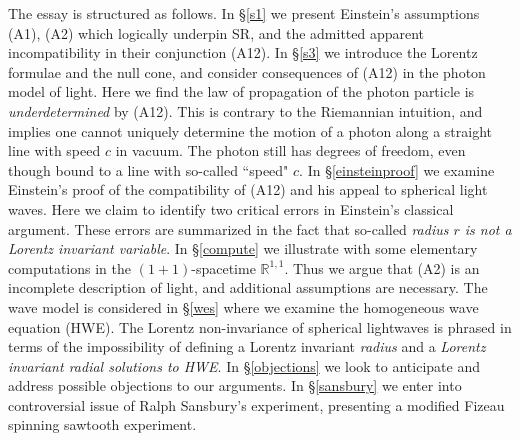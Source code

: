 \documentclass[12pt]{article}
\newcommand{\bR}{\mathbb{R}}
\begin{document}
The essay is structured as follows. In \S \ref{s1} we present Einstein's assumptions (A1), (A2) which logically underpin SR, and the admitted apparent incompatibility in their conjunction (A12). In \S \ref{s3} we introduce the Lorentz formulae and the null cone, and consider consequences of (A12) in the photon model of light. Here we find the law of propagation of the photon particle is \emph{underdetermined} by (A12). This is contrary to the Riemannian intuition, and implies one cannot uniquely determine the motion of a photon along a straight line with speed $c$ in vacuum. The photon still has degrees of freedom, even though bound to a line with so-called ``speed" $c$. In \S \ref{einsteinproof} we examine Einstein's proof of the compatibility of (A12) and his appeal to spherical light waves. Here we claim to identify two critical errors in Einstein's classical argument. These errors are summarized in the fact that so-called \emph{radius $r$ is not a Lorentz invariant variable}. In \S \ref{compute} we illustrate with some elementary computations in the $(1+1)$-spacetime $\bR^{1,1}$. Thus we argue that (A2) is an incomplete description of light, and additional assumptions are necessary. The wave model is considered in \S \ref{wes} where we examine the homogeneous wave equation (HWE). The Lorentz non-invariance of spherical lightwaves is phrased in terms of the impossibility of defining a Lorentz invariant \emph{radius} and a \emph{Lorentz invariant radial solutions to HWE}. In \S \ref{objections} we look to anticipate and address possible objections to our arguments. In \S \ref{sansbury} we enter into controversial issue of Ralph Sansbury's experiment, presenting a modified Fizeau spinning sawtooth experiment.




\end{document}
